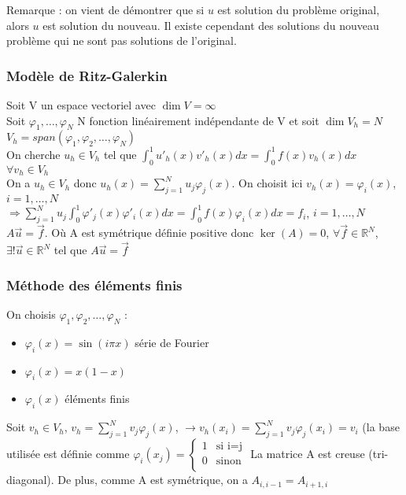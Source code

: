 \documentclass[../main.tex]{subfiles}
\begin{document}
\color{gray}Remarque : on vient de démontrer que si $u$ est solution du problème original, alors $u$ est solution du nouveau. Il existe cependant des solutions du nouveau problème qui ne sont pas solutions de l'original. \color{black}\\

\subsubsection{Modèle de Ritz-Galerkin}
Soit V un espace vectoriel avec $\dim V = \infty$ \\
Soit $\varphi_1, \dots, \varphi_N$ N fonction linéairement indépendante de V et soit $\dim V_h = N$ $V_h = span(\varphi_1, \varphi_2, \dots, \varphi_N)$\\

On cherche $u_h \in V_h$ tel que $\int_0^1 u'_h(x) v'_h(x)dx = \int_0^1 f(x)v_h(x)dx$ $\forall v_h \in V_h$\\

On a $u_h \in V_h$ donc $u_h(x) = \sum_{j=1}^N u_j \varphi_j(x)$. On choisit ici $v_h(x) = \varphi_i(x)$, $i=1,\dots,N$\\
$\Rightarrow \sum_{j=1}^N u_j \int_0^1 \varphi'_j(x)\varphi'_i(x)dx = \int_0^1 f(x) \varphi_i(x) dx= f_i$, $i=1,\dots, N$\\
$A\Vec{u} = \Vec{f}$. Où A est symétrique définie positive donc $\ker(A) = 0$, $\forall \Vec{f} \in \mathbb{R}^N$, $\exists! \Vec{u} \in \mathbb{R}^N$ tel que $A\Vec{u} = \Vec{f}$\\

\subsubsection{Méthode des éléments finis}
On choisis $\varphi_1, \varphi_2, \dots, \varphi_N$ : \begin{itemize}
    \item $\varphi_i(x) = \sin{(i\pi x)}$ série de Fourier\\
    \item $\varphi_i(x) = x(1-x)$\\
    \item $\varphi_i(x)$ éléments finis
\end{itemize}

Soit $v_h \in V_h$, $v_h = \sum_{j=1}^N v_j \varphi_j(x)$, $\rightarrow v_h(x_i) = \sum_{j=1}^N v_j \varphi_j(x_i) = v_i$ (la base utilisée est définie comme $\varphi_i(x_j) = \begin{cases}
    1 & \text{si i=j}\\
    0 & \text{sinon}\\
\end{cases}$
La matrice A est creuse (tri-diagonal). De plus, comme A est symétrique, on a $A_{i,i-1}=A_{i+1,i}$\\
\end{document}

